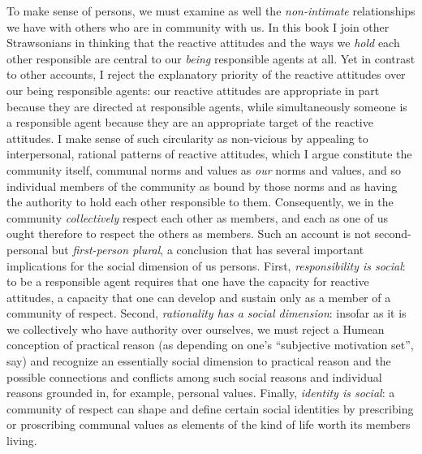 \documentclass[%
  11pt,%
]{article}
\begin{document}
To make sense of persons, we must examine as well the \emph{non-intimate} relationships we have with others who are in community with us. In this book I join other Strawsonians in thinking that the reactive attitudes and the ways we \emph{hold} each other responsible are central to our \emph{being} responsible agents at all. Yet in contrast to other accounts, I reject the explanatory priority of the reactive attitudes over our being responsible agents: our reactive attitudes are appropriate in part because they are directed at responsible agents, while simultaneously someone is a responsible agent because they are an appropriate target of the reactive attitudes. I make sense of such circularity as non-vicious by appealing to interpersonal, rational patterns of reactive attitudes, which I argue constitute the community itself, communal norms and values as \emph{our} norms and values, and so individual members of the community as bound by those norms and as having the authority to hold each other responsible to them. Consequently, we in the community \emph{collectively} respect each other as members, and each as one of us ought therefore to respect the others as members. Such an account is not second-personal but \emph{first-person plural}, a conclusion that has several important implications for the social dimension of us persons. First, \emph{responsibility is social}: to be a responsible agent requires that one have the capacity for reactive attitudes, a capacity that one can develop and sustain only as a member of a community of respect. Second, \emph{rationality has a social dimension}: insofar as it is we collectively who have authority over ourselves, we must reject a Humean conception of practical reason (as depending on one's \enquote{subjective motivation set}, say) and recognize an essentially social dimension to practical reason and the possible connections and conflicts among such social reasons and individual reasons grounded in, for example, personal values. Finally, \emph{identity is social}: a community of respect can shape and define certain social identities by prescribing or proscribing communal values as elements of the kind of life worth its members living.

\ifdefined\HCode
  \subsubsection*{}%
\fi
\end{document}
